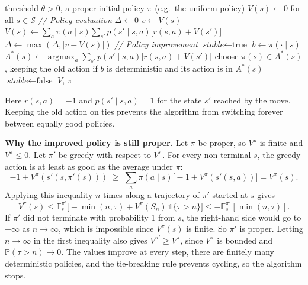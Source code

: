 \documentclass[letterpaper, 11pt]{article}
\newcommand{\pr}{\mathbb{P}}    %
\newcommand{\E}{\mathbb{E}}     %
\newcommand{\1}{\mathds{1}}	%
\DeclareMathOperator*{\argmax}{argmax}    %
\theoremstyle{definition}
\begin{document}
\begin{algorithm}[H]
\caption{Policy iteration for the gridworld ($\gamma = 1$)}
\begin{algorithmic}[1]
\Require threshold $\theta > 0$, a proper initial policy $\pi$ (e.g.\ the uniform policy)
\State $V(s) \gets 0$ for all $s \in \mathcal{S}$ 
\Loop
  \State \textit{// Policy evaluation}
  \Repeat
    \State $\Delta \gets 0$
      \State $v \gets V(s)$
      \State $V(s) \gets \sum_{a} \pi(a \mid s) \sum_{s'} p(s' \mid s, a) \big[ r(s, a) + V(s') \big]$
      \State $\Delta \gets \max(\Delta, |v - V(s)|)$
    \EndFor
  \Until{$\Delta < \theta$}
  \State \textit{// Policy improvement}
  \State $\textit{stable} \gets \text{true}$
    \State $b \gets \pi(\cdot \mid s)$
    \State $A^*(s) \gets \argmax_{a} \sum_{s'} p(s' \mid s, a) \big[ r(s, a) + V(s') \big]$
    \State choose $\pi(s) \in A^*(s)$, keeping the old action if $b$ is deterministic and its action is in $A^*(s)$
     $\textit{stable} \gets \text{false}$ \EndIf
  \EndFor
   \Return $V$, $\pi$ \EndIf
\EndLoop
\end{algorithmic}
\end{algorithm}

Here $r(s, a) = -1$ and $p(s' \mid s, a) = 1$ for the state $s'$ reached by the move. Keeping the old action on ties prevents the algorithm from switching forever between equally good policies.

\textbf{Why the improved policy is still proper.} Let $\pi$ be proper, so $V^\pi$ is finite and $V^\pi \le 0$. Let $\pi'$ be greedy with respect to $V^\pi$. For every non-terminal $s$, the greedy action is at least as good as the average under $\pi$:
\[
-1 + V^\pi(s'(s, \pi'(s))) \;\ge\; \sum_a \pi(a \mid s) \big[-1 + V^\pi(s'(s, a))\big] = V^\pi(s).
\]
Applying this inequality $n$ times along a trajectory of $\pi'$ started at $s$ gives
\[
V^\pi(s) \le \E^{\pi'}_s\Big[-\min(n, \tau) + V^\pi(S_n)\,\1\{\tau > n\}\Big] \le -\E^{\pi'}_s[\min(n, \tau)].
\]
If $\pi'$ did not terminate with probability 1 from $s$, the right-hand side would go to $-\infty$ as $n \to \infty$, which is impossible since $V^\pi(s)$ is finite. So $\pi'$ is proper. Letting $n \to \infty$ in the first inequality also gives $V^{\pi'} \ge V^\pi$, since $V^\pi$ is bounded and $\pr(\tau > n) \to 0$. The values improve at every step, there are finitely many deterministic policies, and the tie-breaking rule prevents cycling, so the algorithm stops.
\end{document}
